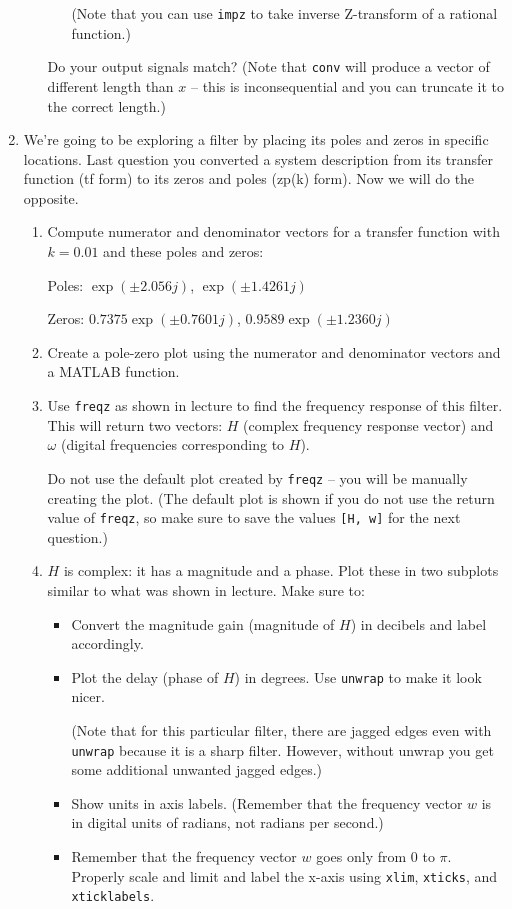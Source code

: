 \documentclass{article}
\begin{document}
\begin{enumerate}
\begin{enumerate}
\begin{enumerate}
				(Note that you can use \lstinline|impz| to take inverse Z-transform of a rational function.)
			\end{enumerate}
			Do your output signals match? (Note that \lstinline|conv| will produce a vector of different length than $x$ -- this is inconsequential and you can truncate it to the correct length.)
		\end{enumerate}
	
		\clearpage
		\item We're going to be exploring a filter by placing its poles and zeros in specific locations. Last question you converted a system description from its transfer function (tf form) to its zeros and poles (zp(k) form). Now we will do the opposite.
		\begin{enumerate}
			\item Compute numerator and denominator vectors for a transfer function with $k=0.01$ and these poles and zeros:
			
			Poles: $\exp(\pm2.056j)$, $\exp(\pm1.4261j)$
			
			Zeros: $0.7375\exp(\pm0.7601j)$, $0.9589\exp(\pm1.2360j)$
			
			\item Create a pole-zero plot using the numerator and denominator vectors and a MATLAB function.
			
			\item Use \lstinline|freqz| as shown in lecture to find the frequency response of this filter. This will return two vectors: $H$ (complex frequency response vector) and $\omega$ (digital frequencies corresponding to $H$).
			
			Do not use the default plot created by \lstinline|freqz| -- you will be manually creating the plot. (The default plot is shown if you do not use the return value of \lstinline|freqz|, so make sure to save the values \lstinline|[H, w]| for the next question.)
			
			\item $H$ is complex: it has a magnitude and a phase. Plot these in two subplots similar to what was shown in lecture. Make sure to:
			\begin{itemize}
				\item Convert the magnitude gain (magnitude of $H$) in decibels and label accordingly.
				\item Plot the delay (phase of $H$) in degrees. Use \lstinline|unwrap| to make it look nicer.
				
				(Note that for this particular filter, there are jagged edges even with \lstinline|unwrap| because it is a sharp filter. However, without unwrap you get some additional unwanted jagged edges.)
				\item Show units in axis labels. (Remember that the frequency vector $w$ is in digital units of radians, not radians per second.)
				\item Remember that the frequency vector $w$ goes only from $0$ to $\pi$. Properly scale and limit and label the x-axis using \lstinline|xlim|, \lstinline|xticks|, and \lstinline|xticklabels|.
			\end{itemize}
		

\end{enumerate}
\end{enumerate}
\end{document}
